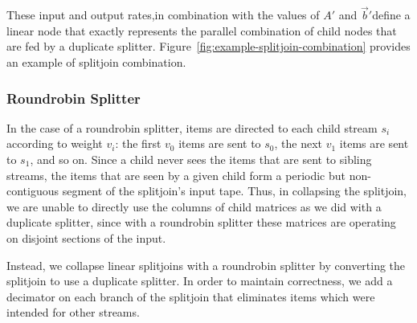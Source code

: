 {These input and output rates,in combination with the values of $A'$
and $\vec{b}'$define a linear node that exactly represents the
parallel combination of child nodes that are fed by a duplicate
splitter. Figure~\ref{fig:example-splitjoin-combination} provides an
example of splitjoin combination.



\subsubsection{Roundrobin Splitter}

In the case of a roundrobin splitter, items are directed to each child
stream $s_i$ according to weight $v_i$: the first $v_0$ items are sent
to $s_0$, the next $v_1$ items are sent to $s_1$, and so on.  Since a
child never sees the items that are sent to sibling streams, the items
that are seen by a given child form a periodic but non-contiguous
segment of the splitjoin's input tape.  Thus, in collapsing the
splitjoin, we are unable to directly use the columns of child matrices
as we did with a duplicate splitter, since with a roundrobin splitter
these matrices are operating on disjoint sections of the input.

Instead, we collapse linear splitjoins with a roundrobin splitter by
converting the splitjoin to use a duplicate splitter.  In order to
maintain correctness, we add a decimator on each branch
of the splitjoin that eliminates items which were intended for other
streams.

}

